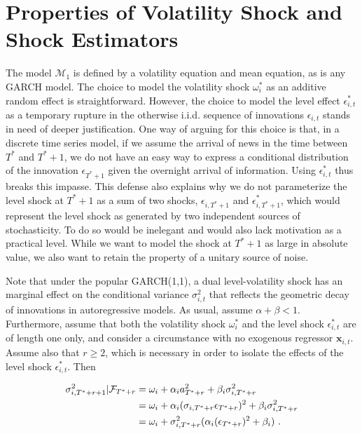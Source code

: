 \documentclass[11pt]{article}
\newcommand{\x}{\textbf{x}}
\def\mc#1{\mathcal{#1}} %
\def\mc#1{\mathcal{#1}}
\theoremstyle{definition}
\begin{document}
\section{Properties of Volatility Shock and Shock Estimators}\label{SVF_properties}

The model $\mc{M}_1$ is defined by a volatility equation and mean equation, as is any GARCH model.  The choice to model the volatility shock $\omega^{*}_{i}$ as an additive random effect is straightforward.  However, the choice to model the level effect $\epsilon^{*}_{i,t}$ as a temporary rupture in the otherwise i.i.d. sequence of innovations $\epsilon_{i,t}$ stands in need of deeper justification.  One way of arguing for this choice is that, in a discrete time series model, if we assume the arrival of news in the time between $T^{*}$ and $T^{*}+1$, we do not have an easy way to express a conditional distribution of the innovation $\epsilon_{T^{*}+1}$ given the overnight arrival of information.  Using $\epsilon^{*}_{i,t}$ thus breaks this impasse.  This defense also explains why we do not parameterize the level shock at $T^{*}+1$ as a sum of two shocks, $\epsilon_{i,T^{*}+1}$ and $\epsilon^{*}_{i,T^{*}+1}$, which would represent the level shock as generated by two independent sources of stochasticity.  To do so would be inelegant and would also lack motivation as a practical level.  While we want to model the shock at $T^{*}+1$ as large in absolute value, we also want to retain the property of a unitary source of noise.

Note that under the popular GARCH(1,1), a dual level-volatility shock has an marginal effect on the conditional variance $\sigma^{2}_{i,t}$ that reflects the geometric decay of innovations in autoregressive models.  As usual, assume $\alpha+\beta < 1$.  Furthermore, assume that both the volatility shock $\omega^{*}_{i}$ and the level shock $\epsilon^{*}_{i,t}$ are of length one only, and consider a circumstance with no exogenous regressor $\x_{i,t}$. Assume also that $r\geq 2$, which is necessary in order to isolate the effects of the level shock $\epsilon^{*}_{i,t}$.  Then

\begin{align}
\sigma^{2}_{i,T^{*}+r+1} | \mathcal{F}_{T^{*}+r} & = \omega_{i} + \alpha_{i} a_{T^{*}+r}^{2} + \beta_{i}\sigma^{2}_{i,T^{*}+r} \label{eq0}\\
& = \omega_{i} + \alpha_{i}(\sigma_{i,T^{*}+r}\epsilon_{T^{*}+r})^{2} + \beta_{i}\sigma^{2}_{i,T^{*}+r}\notag \\
& = \omega_{i} + \sigma^{2}_{i,T^{*}+r}(\alpha_{i} (\epsilon_{T^{*}+r})^{2} + \beta_{i}) \text{ .}\notag 
\end{align}
\end{document}
